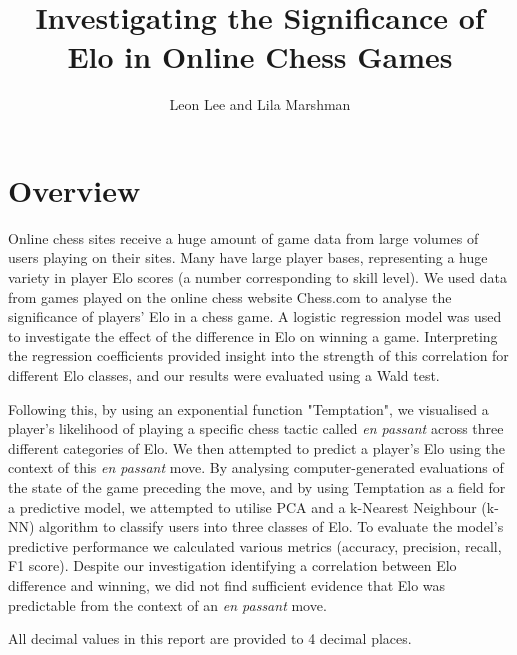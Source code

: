 \documentclass[10pt,a4paper]{article}
\title{Investigating the Significance of Elo in Online Chess Games}
\author{Leon Lee and Lila Marshman}
\begin{document}
\maketitle


\section{Overview}
Online chess sites receive a huge amount of game data from large volumes of users playing on their sites. Many have large player bases, representing a huge variety in player Elo scores (a number corresponding to skill level). We used data from games played on the online chess website Chess.com to analyse the significance of players' Elo in a chess game. A logistic regression model was used to investigate the effect of the difference in Elo on winning a game. Interpreting the regression coefficients provided insight into the strength of this correlation for different Elo classes, and our results were evaluated using a Wald test. \newline

Following this, by using an exponential function "Temptation", we visualised a player's likelihood of playing a specific chess tactic called \textit{en passant} across three different categories of Elo. We then attempted to predict a player's Elo using the context of this \textit{en passant} move. By analysing computer-generated evaluations of the state of the game preceding the move, and by using Temptation as a field for a predictive model, we attempted to utilise PCA and a k-Nearest Neighbour (k-NN) algorithm to classify users into three classes of Elo. To evaluate the model's predictive performance we calculated various metrics (accuracy, precision, recall, F1 score). Despite our investigation identifying a correlation between Elo difference and winning, we did not find sufficient evidence that Elo was predictable from the context of an \textit{en passant} move. \newline

All decimal values in this report are provided to 4 decimal places.
\end{document}
